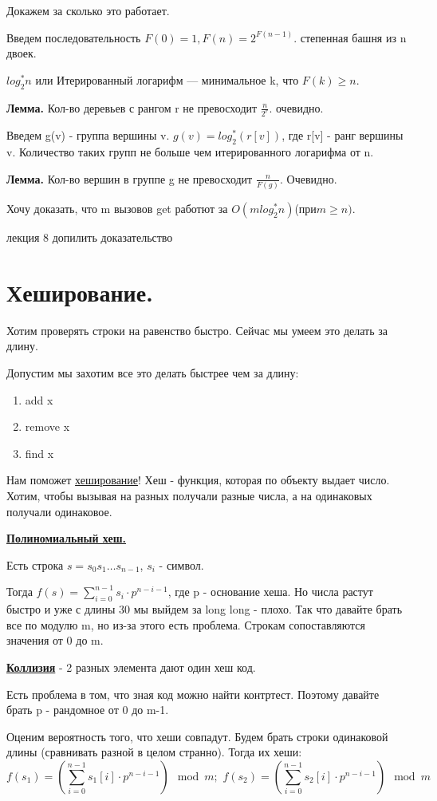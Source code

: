 \documentclass{article}
\begin{document}
Докажем за сколько это работает.

Введем последовательность $F(0)=1, F(n) = 2^{F(n-1)}$. степенная башня из n двоек.

$log_2^*n$ или Итерированный логарифм  --- минимальное k, что $F(k)\geq n$.

\textbf{Лемма.} Кол-во деревьев с рангом r не превосходит $\frac{n}{2^r}$. очевидно.

Введем g(v) - группа вершины v. $g(v) = log_2^*(r[v])$, где r[v] - ранг вершины v. Количество таких групп не больше чем итерированного логарифма от n.

\textbf{Лемма.} Кол-во вершин в группе g не превосходит $\frac{n}{F(g)}$. Очевидно.

Хочу доказать, что m вызовов get работют за $O(mlog_2^*n)$(при$m\geq n)$.

лекция 8 допилить доказательство
\pagebreak
\section{Хеширование.}

Хотим проверять строки  на равенство быстро. Сейчас мы умеем это делать за длину.

Допустим мы захотим все это делать быстрее чем за длину:
\begin{enumerate}
    \item add x
    \item remove x
    \item find x
\end{enumerate}

Нам поможет \uline{хеширование}! Хеш - функция, которая по объекту выдает число. Хотим, чтобы вызывая на разных получали разные числа, а на одинаковых получали одинаковое.

\uline{\textbf{Полиномиальный хеш.}}

Есть строка $s = s_0s_1\ldots s_{n-1}$, $s_i$ - символ.

Тогда $f(s) = \sum\limits_{i=0}^{n-1}s_i\cdot p^{n-i-1}$, где p - основание хеша. Но числа растут быстро и уже с длины 30 мы выйдем за  long long - плохо. Так что давайте брать все по модулю m, но из-за этого есть проблема. Строкам сопоставляются значения от 0 до m.

\uline{\textbf{Коллизия}} -  2 разных элемента дают один  хеш код.

Есть проблема в том, что зная код можно найти контртест. Поэтому давайте брать p - рандомное от 0 до m-1.

Оценим вероятность того, что хеши совпадут. Будем брать строки одинаковой длины (сравнивать разной в целом странно). Тогда их хеши:
\[f(s_1) = (\sum\limits_{i=0}^{n-1}s_1[i]\cdot p^{n-i-1}) \mod m;\,\,f(s_2) = (\sum\limits_{i=0}^{n-1}s_2[i]\cdot p^{n-i-1}) \mod m \]
\end{document}
